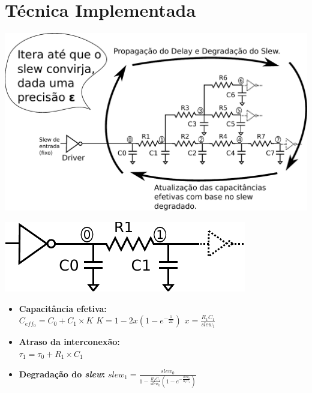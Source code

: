 \documentclass[10pt,a4paper]{beamer}
\begin{document}
	\section{Técnica Implementada}
	
		\begin{frame}
			\includegraphics[width=\textwidth]{img/imagem_puri.pdf} 
		\end{frame}
		
		\begin{frame}
			\begin{minipage}{0.4\textwidth}
				\includegraphics[width=\textwidth]{img/pi.pdf} 

			\end{minipage}
			\begin{minipage}{0.5\textwidth}
				\begin{itemize}
					\item<1-3> \textbf{Capacitância efetiva:}\\
						$C_{eff_0} = C_0 + C_1 \times K$ 
						$K = 1 - 2x(1 - e^{-\frac{1}{2x}})$
						$x = \frac{R_1C_1}{slew_1}$
					\item<2-3> \textbf{Atraso da interconexão:} \\
						$\tau_1 = \tau_0 + R_1 \times C_1$
					\item<3> \textbf{Degradação do \textit{slew}: }
						$slew_1 = \frac{slew_0}{1 - \frac{R_1 C_1}{slew_0} (1 - e^{-\frac{slew_0}{R_1 C_1}})}$
				\end{itemize}
			\end{minipage}
		\end{frame}
	
\end{document}
